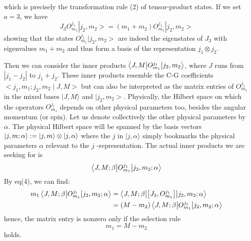 \documentclass{article}
\begin{document}
	which is precisely the transformation rule (2) of tensor-product states. If we set $a=3$, we have
	\begin{equation*}
		J_{3} O_{m_{1}}^{j_{1}}| j_{2} ,m_{2}> =( m_{1} +m_{2}) O_{m_{1}}^{j_{1}}| j_{2} ,m_{2}> 
	\end{equation*}
	showing that the states $O_{m_{1}}^{j_{1}}| j_{2} ,m_{2}> $ are indeed the eigenstates of $J_{3}$ with eigenvalues $m_{1} +m_{2}$ and thus form a basis of the representation $j_{1} \otimes j_{2}$.
	
	Then we can consider the inner products $\mel**{J,M}{O_{m_{1}}^{j_{1}}}{j_{2} ,m_{2}}$, where $J$ runs from $| j_{1} -j_{2}| $ to $j_{1} +j_{2}$. These inner products resemble the C-G coefficients $< j_{1} ,m_{1} ;j_{2} ,m_{2} \mid J,M> $ but can also be interpreted as the matrix entries of $O_{m_{1}}^{j_{1}}$ in the mixed bases $|J,M\rangle $ and $| j_{2} ,m_{2}> $. Physically, the Hilbert space on which the operators $O_{m_{1}}^{j_{1}}$ depends on other physical parameters too, besides the angular momentum (or spin). Let us denote collectively the other physical parameters by $\alpha $. The physical Hilbert space will be spanned by the basis vectors $|j,m;\alpha \rangle :=\ket{j,m} \otimes \ket{j,\alpha }$ where the $j$ in $|j,\alpha \rangle $ simply bookmarks the physical parameters $\alpha $ relevant to the $j$ -representation. The actual inner products we are seeking for is
	\begin{equation*}
		\mel**{J,M;\beta }{O_{m_{1}}^{j_{1}}}{j_{2} ,m_{2} ;\alpha }
	\end{equation*}
	By eq(4), we can find:
	\begin{equation*}
		\begin{aligned}
			m_{1}\mel**{J,M;\beta }{O_{m_{1}}^{j_{1}}}{j_{2} ,m_{2} ;\alpha } & =\mel**{J,M;\beta }{\left[ J_{3} ,O_{m_{1}}^{j_{1}}\right]}{j_{2} ,m_{2} ;\alpha }\\
			& =( M-m_{2})\mel**{J,M;\beta }{O_{m_{1}}^{j_{1}}}{j_{2} ,m_{2} ;\alpha }
		\end{aligned}
	\end{equation*}
	hence, the matrix entry is nonzero only if the selection rule
	\begin{equation*}
		m_{1} =M-m_{2}
	\end{equation*}
	holds. 
	
\end{document}
